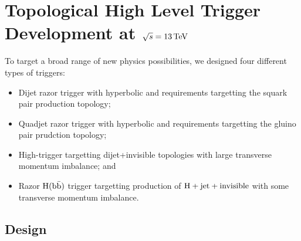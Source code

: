 \chapter{Topological High Level Trigger Development at $\sqrt{s}=13 \,\text{Te\hspace{-.08em}V}$}
\label{ch:hlt13TeV}

To target a broad range of new physics possibilities, we designed four different
types of triggers:
\begin{itemize}
\item Dijet razor trigger with hyperbolic \MR and \Rtwo requirements targetting the squark pair production topology;
\item Quadjet razor trigger with hyperbolic \MR and \Rtwo requirements targetting the gluino pair
  prudction topology;
\item High-\Rtwo trigger targetting dijet+invisible topologies with
  large transverse momentum imbalance; and
\item Razor $\mathrm{H}(\mathrm{b}\bar{\mathrm{b}})$ trigger targetting production of
  $\mathrm{H}+\mathrm{jet}+\mathrm{invisible}$ with some transverse momentum imbalance.
\end{itemize}

\section{Design}


